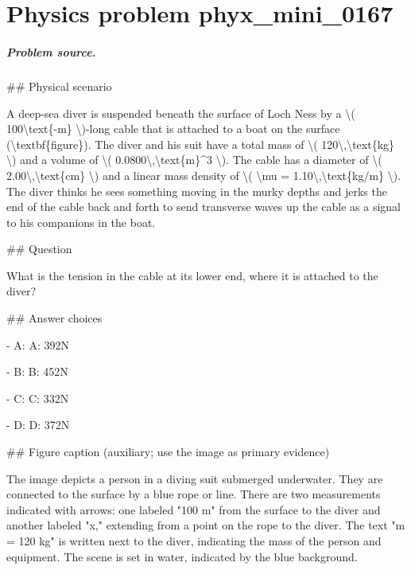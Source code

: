 
\chapter{Physics problem phyx\_mini\_0167}
\label{ch:PhyXMiniProblems_problem_phyx_mini_0167}

\paragraph{Problem source.}
\#\# Physical scenario

A deep-sea diver is suspended beneath the surface of Loch Ness by a \textbackslash{}( 100\textbackslash{}text\{-m\} \textbackslash{})-long cable that is attached to a boat on the surface (\textbackslash{}textbf\{figure\}). The diver and his suit have a total mass of \textbackslash{}( 120\textbackslash{},\textbackslash{}text\{kg\} \textbackslash{}) and a volume of \textbackslash{}( 0.0800\textbackslash{},\textbackslash{}text\{m\}\textasciicircum{}3 \textbackslash{}). The cable has a diameter of \textbackslash{}( 2.00\textbackslash{},\textbackslash{}text\{cm\} \textbackslash{}) and a linear mass density of \textbackslash{}( \textbackslash{}mu = 1.10\textbackslash{},\textbackslash{}text\{kg/m\} \textbackslash{}). The diver thinks he sees something moving in the murky depths and jerks the end of the cable back and forth to send transverse waves up the cable as a signal to his companions in the boat.

\#\# Question

What is the tension in the cable at its lower end, where it is attached to the diver?

\#\# Answer choices

- A: A: 392N

- B: B: 452N

- C: C: 332N

- D: D: 372N

\#\# Figure caption (auxiliary; use the image as primary evidence)

The image depicts a person in a diving suit submerged underwater. They are connected to the surface by a blue rope or line. There are two measurements indicated with arrows: one labeled "100 m" from the surface to the diver and another labeled "x," extending from a point on the rope to the diver. The text "m = 120 kg" is written next to the diver, indicating the mass of the person and equipment. The scene is set in water, indicated by the blue background.

